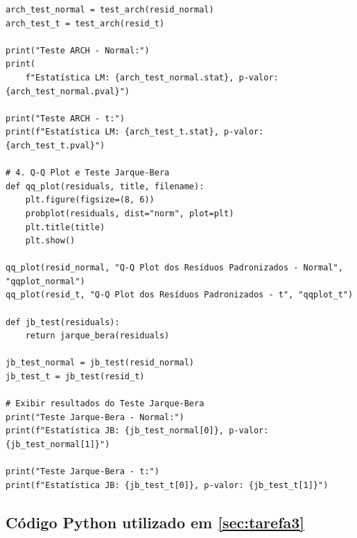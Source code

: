 \documentclass[a4paper, 12pt]{article}
\begin{document}
\begin{lstlisting}[style=python]
arch_test_normal = test_arch(resid_normal)
arch_test_t = test_arch(resid_t)

print("Teste ARCH - Normal:")
print(
    f"Estatística LM: {arch_test_normal.stat}, p-valor: {arch_test_normal.pval}")

print("Teste ARCH - t:")
print(f"Estatística LM: {arch_test_t.stat}, p-valor: {arch_test_t.pval}")

# 4. Q-Q Plot e Teste Jarque-Bera
def qq_plot(residuals, title, filename):
    plt.figure(figsize=(8, 6))
    probplot(residuals, dist="norm", plot=plt)
    plt.title(title)
    plt.show()

qq_plot(resid_normal, "Q-Q Plot dos Resíduos Padronizados - Normal", "qqplot_normal")
qq_plot(resid_t, "Q-Q Plot dos Resíduos Padronizados - t", "qqplot_t")

def jb_test(residuals):
    return jarque_bera(residuals)

jb_test_normal = jb_test(resid_normal)
jb_test_t = jb_test(resid_t)

# Exibir resultados do Teste Jarque-Bera
print("Teste Jarque-Bera - Normal:")
print(f"Estatística JB: {jb_test_normal[0]}, p-valor: {jb_test_normal[1]}")

print("Teste Jarque-Bera - t:")
print(f"Estatística JB: {jb_test_t[0]}, p-valor: {jb_test_t[1]}")

\end{lstlisting}



\subsection{Código Python utilizado em \ref{sec:tarefa3}}\label{apendice:tarefa3}
\end{document}
